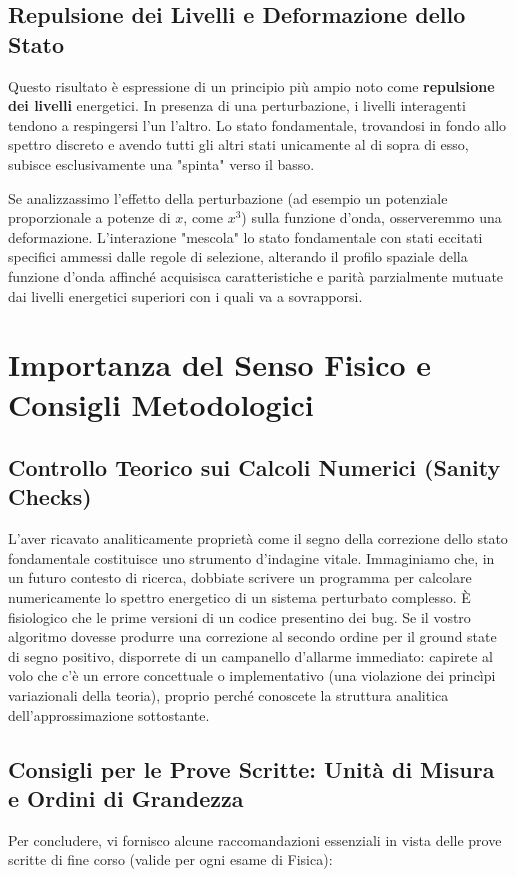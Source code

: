 \subsection{Repulsione dei Livelli e Deformazione dello Stato}
Questo risultato è espressione di un principio più ampio noto come \textbf{repulsione dei livelli} energetici. In presenza di una perturbazione, i livelli interagenti tendono a respingersi l'un l'altro. Lo stato fondamentale, trovandosi in fondo allo spettro discreto e avendo tutti gli altri stati unicamente al di sopra di esso, subisce esclusivamente una "spinta" verso il basso.

Se analizzassimo l'effetto della perturbazione (ad esempio un potenziale proporzionale a potenze di $x$, come $x^3$) sulla funzione d'onda, osserveremmo una deformazione. L'interazione "mescola" lo stato fondamentale con stati eccitati specifici ammessi dalle regole di selezione, alterando il profilo spaziale della funzione d'onda affinché acquisisca caratteristiche e parità parzialmente mutuate dai livelli energetici superiori con i quali va a sovrapporsi.

\section{Importanza del Senso Fisico e Consigli Metodologici}

\subsection{Controllo Teorico sui Calcoli Numerici (Sanity Checks)}
L'aver ricavato analiticamente proprietà come il segno della correzione dello stato fondamentale costituisce uno strumento d'indagine vitale.
Immaginiamo che, in un futuro contesto di ricerca, dobbiate scrivere un programma per calcolare numericamente lo spettro energetico di un sistema perturbato complesso. È fisiologico che le prime versioni di un codice presentino dei bug. Se il vostro algoritmo dovesse produrre una correzione al secondo ordine per il ground state di segno positivo, disporrete di un campanello d'allarme immediato: capirete al volo che c'è un errore concettuale o implementativo (una violazione dei princìpi variazionali della teoria), proprio perché conoscete la struttura analitica dell'approssimazione sottostante.

\subsection{Consigli per le Prove Scritte: Unità di Misura e Ordini di Grandezza}
Per concludere, vi fornisco alcune raccomandazioni essenziali in vista delle prove scritte di fine corso (valide per ogni esame di Fisica):

